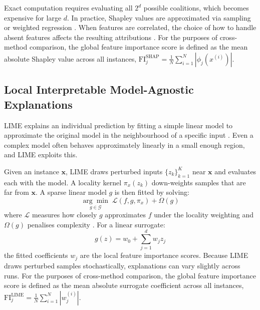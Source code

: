 Exact computation requires evaluating all $2^d$ possible coalitions, which becomes expensive for large $d$. In practice, Shapley values are approximated via sampling or weighted regression \citep{lundberg2017unified, strumbelj_explaining_2014}. When features are correlated, the choice of how to handle absent features affects the resulting attributions \citep{aas_explaining_2021}. For the purposes of cross-method comparison, the global feature importance score is defined as the mean absolute Shapley value across all instances, $\text{FI}^{\text{SHAP}}_j = \frac{1}{N}\sum_{i=1}^{N}|\phi_j(x^{(i)})|$.

\subsection{Local Interpretable Model-Agnostic Explanations}

LIME explains an individual prediction by fitting a simple linear model to approximate the original model in the neighbourhood of a specific input \citep{ribeiro2016modelagnosticinterpretabilitymachinelearning}. Even a complex model often behaves approximately linearly in a small enough region, and LIME exploits this.

Given an instance $\mathbf{x}$, LIME draws perturbed inputs $\{z_k\}_{k=1}^{K}$ near $\mathbf{x}$ and evaluates each with the model. A locality kernel $\pi_x(z_k)$ down-weights samples that are far from $\mathbf{x}$. A sparse linear model $g$ is then fitted by solving:
%
\begin{equation}
    \underset{g \in \mathcal{G}}{\arg\min} \; \mathcal{L}(f, g, \pi_x) + \Omega(g)
    \label{eq:lime_opt}
\end{equation}
%
where $\mathcal{L}$ measures how closely $g$ approximates $f$ under the locality weighting and $\Omega(g)$ penalises complexity \citep{ribeiro2016modelagnosticinterpretabilitymachinelearning}. For a linear surrogate:
%
\begin{equation}
    g(z) = w_0 + \sum_{j=1}^{d} w_j z_j
    \label{eq:lime_surrogate}
\end{equation}
%
the fitted coefficients $w_j$ are the local feature importance scores. Because LIME draws perturbed samples stochastically, explanations can vary slightly across runs. For the purposes of cross-method comparison, the global feature importance score is defined as the mean absolute surrogate coefficient across all instances, $\text{FI}^{\text{LIME}}_j = \frac{1}{N}\sum_{i=1}^{N}|w_j^{(i)}|$.

